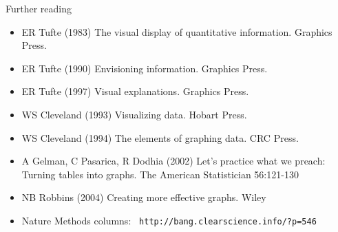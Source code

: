 \documentclass[12pt]{article}
\newcommand{\headsize}{\fontsize{35}{35} \selectfont}
\newcommand{\smallestsize}{\fontsize{18}{22} \selectfont}
\begin{document}
\newpage


\headsize \color{myyellow}
\hfill \begin{minipage}{5.75in}
\centering
Further reading
\end{minipage}

\vspace{30mm}
\smallestsize \color{mywhite}

\hspace{0.5in} \begin{minipage}[t]{9in}
\begin{itemize}

\itemsep12pt

\item ER Tufte (1983) The visual display of quantitative information.
Graphics Press.
\item ER Tufte (1990) Envisioning information. Graphics Press.
\item ER Tufte (1997) Visual explanations. Graphics Press.

\vspace*{8mm}

\item WS Cleveland (1993) Visualizing data. Hobart Press.
\item WS Cleveland (1994) The elements of graphing data. CRC Press.

\vspace*{8mm}

\item A Gelman, C Pasarica, R Dodhia (2002) Let's practice what we preach:
Turning tables into graphs. The American Statistician 56:121-130

\vspace*{8mm}

\item NB Robbins (2004) Creating more effective graphs. Wiley

\vspace*{8mm}

\item Nature Methods columns: {\tt \color{myblue} http://bang.clearscience.info/?p=546}

\end{itemize}
\end{minipage}
\end{document}
